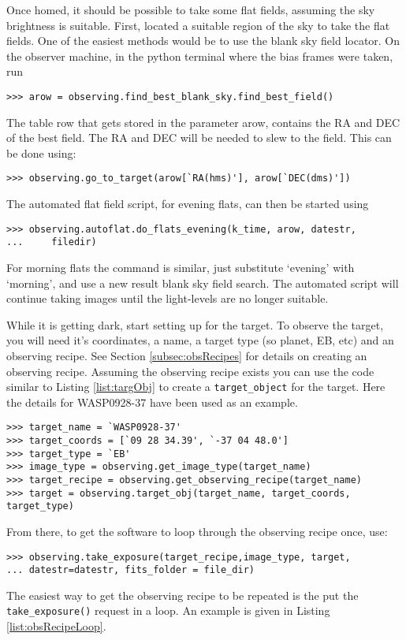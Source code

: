 \documentclass[a4paper,12pt]{article}
\begin{document}
Once homed, it should be possible to take some flat fields, assuming the sky brightness is suitable. First, located a suitable region of the sky to take the flat fields. One of the easiest methods would be to use the blank sky field locator. On the observer machine, in the python terminal where the bias frames were taken, run
\begin{verbatim}
>>> arow = observing.find_best_blank_sky.find_best_field()
\end{verbatim}
The table row that gets stored in the parameter arow, contains the RA and DEC of the best field. The RA and DEC will be needed to slew to the field. This can be done using:
\begin{verbatim}
>>> observing.go_to_target(arow[`RA(hms)'], arow[`DEC(dms)'])
\end{verbatim}
The automated flat field script, for evening flats, can then be started using
\begin{verbatim}
>>> observing.autoflat.do_flats_evening(k_time, arow, datestr, 
...		filedir)
\end{verbatim}
For morning flats the command is similar, just substitute `evening' with `morning', and use a new result blank sky field search. The automated script will continue taking images until the light-levels are no longer suitable.

While it is getting dark, start setting up for the target. To observe the target, you will need it's coordinates, a name, a target type (so planet, EB, etc) and an observing recipe. See Section \ref{subsec:obsRecipes} for details on creating an observing recipe. Assuming the observing recipe exists you can use the code similar to Listing \ref{list:targObj} to create a {\tt target\_object} for the target. Here the details for WASP0928-37 have been used as an example.
\begin{lstlisting}[caption={Creating {\tt target\_object} for WASP0928-37}, label={list:targObj}]
>>> target_name = `WASP0928-37'
>>> target_coords = [`09 28 34.39', `-37 04 48.0']
>>> target_type = `EB' 
>>> image_type = observing.get_image_type(target_name)
>>> target_recipe = observing.get_observing_recipe(target_name)
>>> target = observing.target_obj(target_name, target_coords, target_type) 
\end{lstlisting}
From there, to get the software to loop through the observing recipe once, use:
\begin{verbatim}
>>> observing.take_exposure(target_recipe,image_type, target, 
...	datestr=datestr, fits_folder = file_dir)
\end{verbatim}
The easiest way to get the observing recipe to be repeated is the put the {\tt take\_exposure()} request in a loop. An example is given in Listing \ref{list:obsRecipeLoop}.
\end{document}
